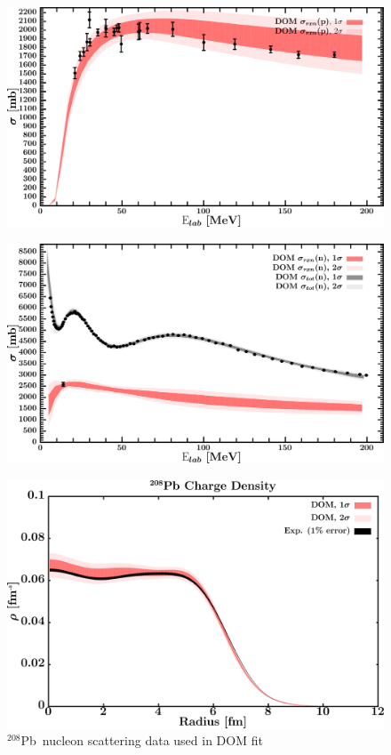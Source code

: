 \documentclass[twocolumn,secnumarabic,amssymb, nobibnotes, aps, prl,
superscriptaddress, nobalancelastpage, draft]{revtex4}
\newcommand{\pbEight}{\ensuremath{^{208}}P\lowercase{b}}
\begin{document}
\begin{figure}[!htb]
\begin{minipage}{0.4\linewidth}
        \label{DOM_pb208_neutron_elastic}
    \end{minipage}
    \centering
    \begin{minipage}{0.4\linewidth}
        \centering
        \includegraphics[width=\linewidth]{figures/pb208_protonInelastic.png}
        \label{DOM_pb208_proton_inelastic}
    \end{minipage}\hspace{6pt}
    \begin{minipage}{0.4\linewidth}
        \centering
        \includegraphics[width=\linewidth]{figures/pb208_neutronInelastic.png}
        \label{DOM_pb208_neutron_inelastic}
    \end{minipage}
    \caption{\pbEight\ nucleon scattering data used in DOM fit}
    \label{DOM_pb208_scattering}
    \centering
    \begin{minipage}{0.4\linewidth}
        \centering
        \includegraphics[width=\linewidth]{figures/pb208_chargeDensity.png}

\end{minipage}
\end{figure}
\end{document}

